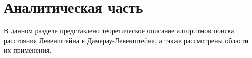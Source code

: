 \chapter{Аналитическая часть}

В данном разделе представлено теоретическое описание алгоритмов поиска расстояния Левенштейна и Дамерау-Левенштейна, а также рассмотрены области их применения.


